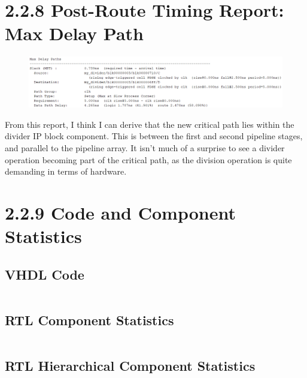 \documentclass[11pt]{report}
\begin{document}
\section*{2.2.8 Post-Route Timing Report: Max Delay Path}
\begin{figure}[H]
    \includegraphics[width=\columnwidth]{Assets/2.2.8_max-delay-path.png}
\end{figure}
From this report, I think I can derive that the new critical path lies within the divider IP block component. This is between the first and second pipeline stages, and parallel to the pipeline array. It isn't much of a surprise to see a divider operation becoming part of the critical path, as the division operation is quite demanding in terms of hardware.

\section*{2.2.9 Code and Component Statistics}
\subsection*{VHDL Code}
\inputminted[firstline=23]{vhdl}{"../../Lab3TaskBP3/Lab3TaskBP3.srcs/sources_1/imports/sources_1/imports/Digital Engineering/Algorithm.vhd"}


\break
\subsection*{RTL Component Statistics}
\inputminted[firstline=94, lastline=101]{text}{"../../Lab3TaskBP3/Lab3TaskBP3.runs/synth_1/algorithm.vds"}

\subsection*{RTL Hierarchical Component Statistics}
\inputminted[firstline=108, lastline=117]{text}{"../../Lab3TaskBP3/Lab3TaskBP3.runs/synth_1/algorithm.vds"}
\end{document}
